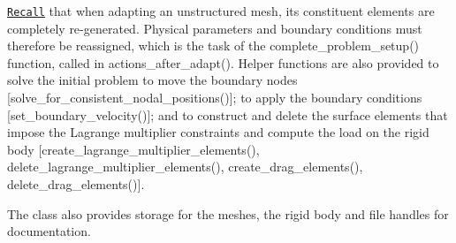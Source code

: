 \href{../../../../doc/meshes/mesh_from_inline_triangle/html/index.html#adapt}{\tt Recall} that when adapting an unstructured mesh, its constituent elements are completely re-\/generated. Physical parameters and boundary conditions must therefore be reassigned, which is the task of the {\ttfamily complete\+\_\+problem\+\_\+setup()} function, called in {\ttfamily actions\+\_\+after\+\_\+adapt()}. Helper functions are also provided to solve the initial problem to move the boundary nodes \mbox{[}{\ttfamily solve\+\_\+for\+\_\+consistent\+\_\+nodal\+\_\+positions()}\mbox{]}; to apply the boundary conditions \mbox{[}{\ttfamily set\+\_\+boundary\+\_\+velocity()}\mbox{]}; and to construct and delete the surface elements that impose the Lagrange multiplier constraints and compute the load on the rigid body \mbox{[}{\ttfamily create\+\_\+lagrange\+\_\+multiplier\+\_\+elements()}, {\ttfamily delete\+\_\+lagrange\+\_\+multiplier\+\_\+elements()}, {\ttfamily create\+\_\+drag\+\_\+elements()}, {\ttfamily delete\+\_\+drag\+\_\+elements()}\mbox{]}.

The class also provides storage for the meshes, the rigid body and file handles for documentation.


